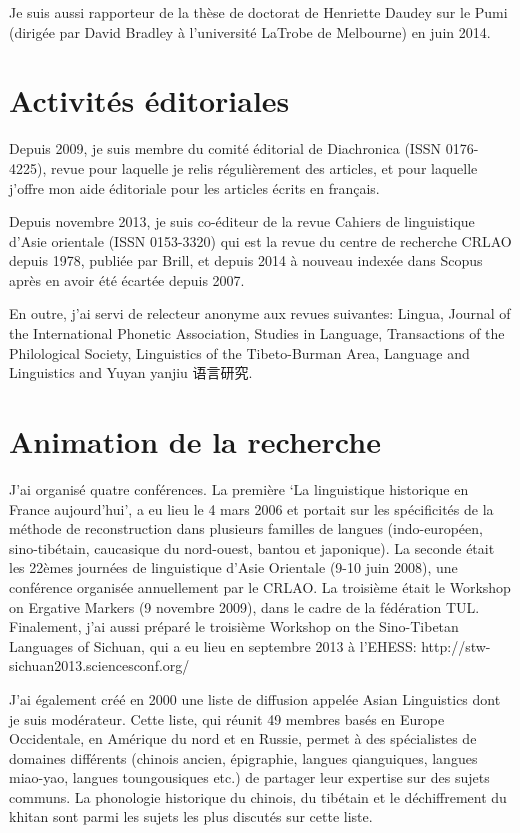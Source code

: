 \documentclass[oldfontcommands,oneside,a4paper,11pt]{memoir}
\newcommand{\zh}[1]{{\cn #1}}
\begin{document}
Je suis aussi rapporteur de la thèse de doctorat de Henriette Daudey sur le Pumi (dirigée par David Bradley à l'université LaTrobe de Melbourne) en juin 2014.
 \section{Activités éditoriales}
Depuis 2009, je suis membre du comité éditorial de Diachronica (ISSN 0176-4225), revue pour laquelle je relis régulièrement des articles, et pour laquelle j'offre mon aide éditoriale pour les articles écrits en français.


 Depuis novembre 2013, je suis co-éditeur de la revue Cahiers de linguistique d'Asie orientale (ISSN 0153-3320) qui est la revue du centre de recherche CRLAO depuis 1978,   publiée par Brill, et depuis 2014 à nouveau indexée dans Scopus  après en avoir été écartée depuis 2007.
 
 En outre, j'ai servi de relecteur anonyme aux revues suivantes: 		Lingua, Journal of the International Phonetic Association, Studies in Language, Transactions of the Philological Society, Linguistics of the Tibeto-Burman Area, Language and Linguistics and Yuyan yanjiu \zh{语言研究}.

\section{Animation de la recherche}
J’ai organisé quatre conférences. La première ‘La linguistique historique en France aujourd’hui’, a eu lieu le 4 mars 2006 et portait sur les spécificités de la méthode de reconstruction dans plusieurs familles de langues (indo-européen, sino-tibétain, caucasique du nord-ouest, bantou et japonique). La seconde était les 22èmes journées de linguistique d’Asie Orientale (9-10 juin 2008), une conférence organisée annuellement par le CRLAO. La troisième était le Workshop on Ergative Markers (9 novembre 2009), dans le cadre de la fédération TUL. Finalement, j'ai aussi préparé  le troisième Workshop on the Sino-Tibetan Languages of Sichuan, qui a eu lieu en septembre 2013 à l'EHESS: http://stw-sichuan2013.sciencesconf.org/

 

J’ai également créé en 2000 une liste de diffusion appelée Asian Linguistics dont je suis modérateur. Cette liste, qui réunit 49 membres basés en Europe Occidentale, en Amérique du nord et en Russie, permet à des spécialistes de domaines différents (chinois ancien, épigraphie, langues qianguiques, langues miao-yao, langues toungousiques etc.) de partager leur expertise sur des sujets communs. La phonologie historique du chinois, du tibétain et le déchiffrement du khitan sont parmi les sujets les plus discutés sur cette liste.
\end{document}
